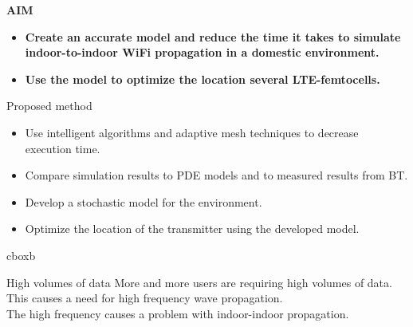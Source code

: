 \documentclass[final]{beamer}
\theoremstyle{plain}
\theoremstyle{definition}
\theoremstyle{remark}
\newlength{\twocolwid}
\begin{document}
\begin{frame}[t]
\begin{columns}[t]
\begin{column}{\twocolwid}
\begin{mdframed}[backgroundcolor=white, userdefinedwidth=0.999999\linewidth]
    \end{mdframed}
    \vspace{1.5cm}
\begin{mdframed}[backgroundcolor=white]
\begin{alertblock}{\textbf{AIM}}

\begin{itemize}

\item \textbf{Create an accurate model and reduce the time it takes to simulate indoor-to-indoor WiFi propagation in a domestic environment.}
\item \textbf{Use the model to optimize the location several LTE-femtocells.
}
\end{itemize}
\end{alertblock}
\vspace{-1cm}
\end{mdframed}
\vspace{2cm}



\begin{block}{Proposed method}
\vspace{-2cm}
\begin{itemize}
\item Use intelligent algorithms and adaptive mesh techniques to decrease execution time.
\item Compare simulation results to PDE models and to measured results from BT.
\item Develop a stochastic model for the environment.
\item Optimize the location of the transmitter using the developed model.
\end{itemize}
\end{block}
 
 \vspace{-2cm}
 \hspace{0.5in}
 \begin{beamercolorbox}[wd=14in,colsep=0.15cm]{cboxb}
 \end{beamercolorbox}
 
\vspace{1cm}
\begin{alertblock}{High volumes of data }
More and more users are requiring high volumes of data. This causes a need for high frequency wave propagation.
\\ 
The high frequency causes a problem with indoor-indoor propagation.
\end{alertblock}


\end{column}
\end{columns}
\end{frame}
\end{document}
